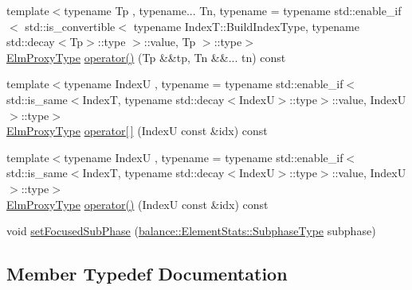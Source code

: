 \begin{DoxyCompactItemize}
\item 
{\footnotesize template$<$typename Tp , typename... Tn, typename  = typename std\+::enable\+\_\+if$<$      std\+::is\+\_\+convertible$<$        typename Index\+T\+::\+Build\+Index\+Type, typename std\+::decay$<$\+Tp$>$\+::type      $>$\+::value, Tp    $>$\+::type$>$ }\\\hyperlink{structvt_1_1vrt_1_1collection_1_1_collection_proxy_a892c21eae1dca37321d7973f72b55b0a}{Elm\+Proxy\+Type} \hyperlink{structvt_1_1vrt_1_1collection_1_1_collection_proxy_a8a06bed8946060c4d1e11f665e05e64f}{operator()} (Tp \&\&tp, Tn \&\&... tn) const
\item 
{\footnotesize template$<$typename IndexU , typename  = typename std\+::enable\+\_\+if$<$      std\+::is\+\_\+same$<$\+Index\+T, typename std\+::decay$<$\+Index\+U$>$\+::type$>$\+::value, Index\+U    $>$\+::type$>$ }\\\hyperlink{structvt_1_1vrt_1_1collection_1_1_collection_proxy_a892c21eae1dca37321d7973f72b55b0a}{Elm\+Proxy\+Type} \hyperlink{structvt_1_1vrt_1_1collection_1_1_collection_proxy_a81f027fb0c7d2b55ec06a2f91dd8d72e}{operator\mbox{[}$\,$\mbox{]}} (IndexU const \&idx) const
\item 
{\footnotesize template$<$typename IndexU , typename  = typename std\+::enable\+\_\+if$<$      std\+::is\+\_\+same$<$\+Index\+T, typename std\+::decay$<$\+Index\+U$>$\+::type$>$\+::value, Index\+U    $>$\+::type$>$ }\\\hyperlink{structvt_1_1vrt_1_1collection_1_1_collection_proxy_a892c21eae1dca37321d7973f72b55b0a}{Elm\+Proxy\+Type} \hyperlink{structvt_1_1vrt_1_1collection_1_1_collection_proxy_a53d97b9ca0294b4254556620463708d9}{operator()} (IndexU const \&idx) const
\item 
void \hyperlink{structvt_1_1vrt_1_1collection_1_1_collection_proxy_abec1613e3487c767e7c8c060abe8781a}{set\+Focused\+Sub\+Phase} (\hyperlink{structvt_1_1vrt_1_1collection_1_1balance_1_1_element_stats_af9ec1f2527b6569a003579f7950db71e}{balance\+::\+Element\+Stats\+::\+Subphase\+Type} subphase)
\end{DoxyCompactItemize}


\subsection{Member Typedef Documentation}
\mbox{\label{structvt_1_1vrt_1_1collection_1_1_collection_proxy_a892c21eae1dca37321d7973f72b55b0a}} 
